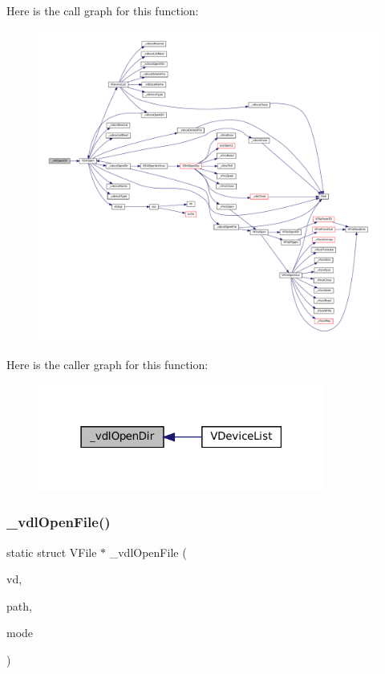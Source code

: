 Here is the call graph for this function\+:
\nopagebreak
\begin{figure}[H]
\begin{center}
\leavevmode
\includegraphics[width=350pt]{vfs-devlist_8c_aaf038c5fba8a9f2f2f8c10b67ee85a2d_cgraph}
\end{center}
\end{figure}
Here is the caller graph for this function\+:
\nopagebreak
\begin{figure}[H]
\begin{center}
\leavevmode
\includegraphics[width=267pt]{vfs-devlist_8c_aaf038c5fba8a9f2f2f8c10b67ee85a2d_icgraph}
\end{center}
\end{figure}
\mbox{\label{vfs-devlist_8c_acb6e731f02f207723fe2d49f597c8e30}} 
\subsubsection{\texorpdfstring{\+\_\+vdl\+Open\+File()}{\_vdlOpenFile()}}
{\footnotesize\ttfamily static struct V\+File $\ast$ \+\_\+vdl\+Open\+File (\begin{DoxyParamCaption}\item[{struct V\+Dir $\ast$}]{vd,  }\item[{const char $\ast$}]{path,  }\item[{\mbox{\hyperlink{ioapi_8h_a787fa3cf048117ba7123753c1e74fcd6}{int}}}]{mode }\end{DoxyParamCaption})\hspace{0.3cm}{\ttfamily [static]}}

